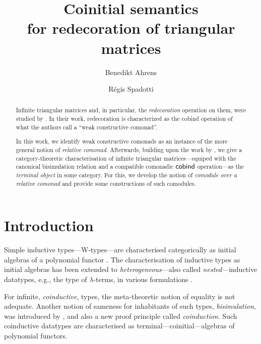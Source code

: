 \documentclass{amsart}
\author{Benedikt Ahrens}
\author{R\'egis Spadotti}
\title[Coinitial semantics for redecoration of triangular matrices]{Coinitial semantics \\ for redecoration of triangular matrices}
\begin{document}
\begin{abstract}
  Infinite triangular matrices and, in particular, the \emph{redecoration} operation on them, 
  were studied by \citeauthor{DBLP:conf/types/MatthesP11}. In their work,  redecoration is characterized
  as the cobind operation of what the authors call a \enquote{weak constructive comonad}.
  
  In this work, we identify weak constructive comonads as an instance of the more general notion of 
  \emph{relative comonad}.
  Afterwards, building upon the work by \citeauthor{DBLP:conf/types/MatthesP11}, we give a category-theoretic
  characterisation of infinite triangular matrices---equiped with the canonical bisimulation relation and a 
  compatible comonadic $\mathsf{cobind}$ operation---as the \emph{terminal object}
  in some category.
% 
  For this, we develop the notion of \emph{comodule over a relative comonad} and provide some constructions of such comodules.

\end{abstract}

\maketitle


\section{Introduction}

 Simple inductive types---\textsf{W}-types---are characterised categorically as initial algebras of
 a polynomial functor \parencite{DBLP:journals/apal/MoerdijkP00}.
 The characterisation of inductive types as initial algebras 
 has been extended to \emph{heterogeneous}---also called \emph{nested}---inductive datatypes, e.g., the type of $\lambda$-terms,
 in various formulations \parencite{fpt, DBLP:journals/iandc/HirschowitzM10}.
 
 For infinite, \emph{coinductive}, types, the meta-theoretic notion of equality is not adequate. Another notion of sameness for inhabitants of such types, 
 \emph{bisimulation}, was introduced by \textcite{aczel_nonwellfounded}, and also
 a new proof principle called \emph{coinduction}. 
 Such coinductive datatypes are characterised as terminal---coinitial---algebras of polynomial functors.
\end{document}
